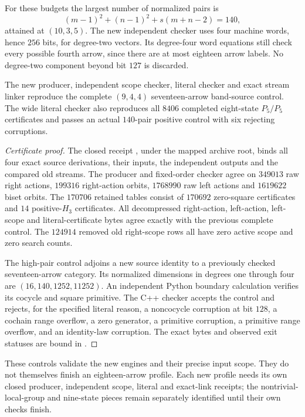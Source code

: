 For these budgets the largest number of normalized pairs is
\[
 (m-1)^2+(n-1)^2+s(m+n-2)=140,
\]
attained at $(10,3,5)$.  The new independent checker uses
four machine words, hence $256$ bits, for degree-two
vectors.  Its degree-four word equations still check
every possible fourth arrow, since there are at most
eighteen arrow labels.  No degree-two component beyond
bit $127$ is discarded.

\begin{proposition}
\label{CP2:A-oriented-eighteen-engine-control}
The new producer, independent scope checker, literal
checker and exact stream linker reproduce the complete
$(9,4,4)$ seventeen-arrow band-source control.  The wide
literal checker also reproduces all $8406$ completed
eight-state $P_5/P_5$ certificates and passes an actual
$140$-pair positive control with six rejecting corruptions.
\end{proposition}
\begin{proof}[Certificate proof]
The closed receipt
, under the
mapped 
archive root, binds all four exact source derivations,
their inputs, the independent outputs and the compared
old streams.  The producer and fixed-order checker agree
on $349013$ raw right actions, $199316$ right-action
orbits, $1768990$ raw left actions and $1619622$ biset
orbits.  The $170706$ retained tables consist of $170692$
zero-square certificates and $14$ positive-$H_3$ certificates.
All decompressed right-action, left-action, left-scope
and literal-certificate bytes agree exactly with the
previous complete control.  The $124914$ removed old
right-scope rows all have zero active scope and zero
search counts.

The high-pair control adjoins a new source identity to a
previously checked seventeen-arrow category.  Its normalized
dimensions in degrees one through four are
$(16,140,1252,11252)$.  An independent Python boundary
calculation verifies its cocycle and square primitive.
The C++ checker accepts the control and rejects, for the
specified literal reason, a noncocycle corruption at bit
$128$, a cochain range overflow, a zero generator, a
primitive corruption, a primitive range overflow, and
an identity-law corruption.  The exact bytes and observed
exit statuses are bound in
.
\end{proof}

\begin{remark*}
These controls validate the new engines and their precise
input scope.  They do not themselves finish an eighteen-arrow
profile.  Each new profile needs its own closed producer,
independent scope, literal and exact-link receipts; the
nontrivial-local-group and nine-state pieces remain separately
identified until their own checks finish.
\end{remark*}
